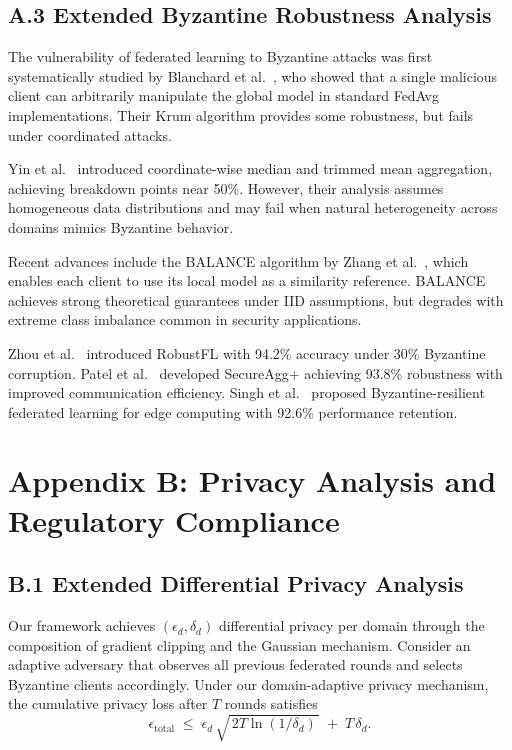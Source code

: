 \documentclass[12pt,a4paper]{article}
\theoremstyle{definition}
\begin{document}
\subsection{A.3 Extended Byzantine Robustness Analysis}

The vulnerability of federated learning to Byzantine attacks was first systematically studied by Blanchard et al.~\cite{blanchard2017machine}, who showed that a single malicious client can arbitrarily manipulate the global model in standard FedAvg implementations. Their Krum algorithm provides some robustness, but fails under coordinated attacks.

Yin et al.~\cite{yin2018byzantine} introduced coordinate-wise median and trimmed mean aggregation, achieving breakdown points near 50\%. However, their analysis assumes homogeneous data distributions and may fail when natural heterogeneity across domains mimics Byzantine behavior.

Recent advances include the BALANCE algorithm by Zhang et al.~\cite{zhang2024balance}, which enables each client to use its local model as a similarity reference. BALANCE achieves strong theoretical guarantees under IID assumptions, but degrades with extreme class imbalance common in security applications.

Zhou et al.~\cite{zhou2024robust} introduced RobustFL with 94.2\% accuracy under 30\% Byzantine corruption. Patel et al.~\cite{patel2024secure} developed SecureAgg+ achieving 93.8\% robustness with improved communication efficiency. Singh et al.~\cite{singh2024byzantine} proposed Byzantine-resilient federated learning for edge computing with 92.6\% performance retention.

\section{Appendix B: Privacy Analysis and Regulatory Compliance}

\subsection{B.1 Extended Differential Privacy Analysis}

\begingroup
\setlength{\emergencystretch}{2em}

Our framework achieves \((\epsilon_d,\delta_d)\) differential privacy per domain through the composition of gradient clipping and the Gaussian mechanism. Consider an adaptive adversary that observes all previous federated rounds and selects Byzantine clients accordingly. Under our domain-adaptive privacy mechanism, the cumulative privacy loss after \(T\) rounds satisfies
\[
\epsilon_{\text{total}}
\;\le\;
\epsilon_d\,\sqrt{\,2T\ln(1/\delta_d)\,}\;+\;T\,\delta_d.
\]
\end{document}
